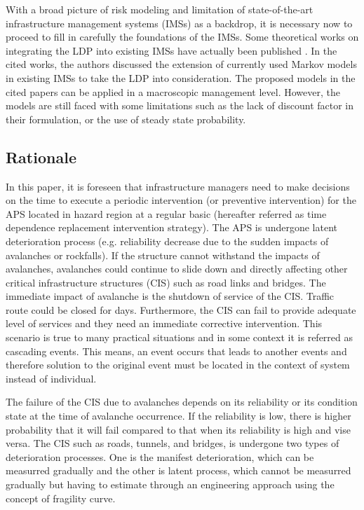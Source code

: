\documentclass[fleqn]{article}
\begin{document}
With a broad picture of risk modeling and limitation of state-of-the-art infrastructure management systems (IMSs) as a backdrop, it is necessary now to proceed to fill in carefully the foundations of the IMSs. Some theoretical works on integrating the LDP into existing IMSs have actually been published \citep{Mayet2002, Lethanh2013}. In the cited works, the authors discussed the extension of currently used Markov models in existing IMSs to take the LDP into consideration. The proposed models in the cited papers can be applied in a macroscopic management level. However, the models are still faced with some limitations such as the lack of discount factor in their formulation, or the use of steady state probability.

\subsection{Rationale}
In this paper, it is foreseen that infrastructure managers need to make decisions on the time to execute a periodic intervention (or preventive intervention) for the APS located in hazard region at a regular basic (hereafter referred as time dependence replacement intervention strategy). The APS is undergone latent deterioration process (e.g. reliability decrease due to the sudden impacts of avalanches or rockfalls). If the structure cannot withstand the impacts of avalanches, avalanches could continue to slide down and directly affecting other critical infrastructure structures (CIS) such as road links and bridges. The immediate impact of avalanche is the shutdown of service of the CIS. Traffic route could be closed for days. Furthermore, the CIS can fail to provide adequate level of services and they need an immediate corrective intervention. This scenario is true to many practical situations and in some context it is referred as cascading events. This means, an event occurs that leads to another events and therefore solution to the original event must be located in the context of system instead of individual.

The failure of the CIS due to avalanches depends on its reliability or its condition state at the time of avalanche occurrence. If the reliability is low, there is higher probability that it will fail compared to that when its reliability is high and vise versa. The CIS such as roads, tunnels, and bridges, is undergone two types of deterioration processes. One is the manifest deterioration, which can be measurred gradually and the other is latent process, which cannot be measurred gradually but having to estimate through an engineering approach using the concept of fragility curve.
\end{document}
